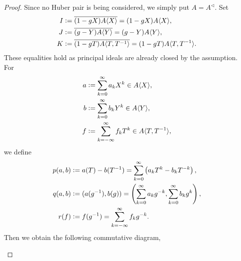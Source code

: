 \documentclass[10pt]{article}
\numberwithin{equation}{section}
\theoremstyle{definition}
\newcommand{\defeq}{\vcentcolon=}
\begin{document}
\begin{proof}
    Since no Huber pair is being considered, we simply put $A=A^\triangleleft$. Set 
    \begin{align*}
        I &\defeq\overline{(1-gX)A\langle X\rangle}= (1-gX)A\langle X\rangle,\\
        J &\defeq\overline{(g-Y)A\langle Y\rangle} = (g-Y)A\langle Y\rangle,\\
        K &\defeq \overline{(1-gT)A\langle T,T^{-1}\rangle}=(1-gT)A\langle T,T^{-1}\rangle.
    \end{align*}
    These equalities hold as principal ideals are already closed by the assumption.
    For 
    \begin{align*}
        a & \defeq \sum_{k=0}^\infty a_kX^k\in A\langle X\rangle,\\
        b & \defeq \sum_{k=0}^\infty  b_k Y^k\in A\langle Y\rangle,\\
        f & \defeq \sum_{k=-\infty}^\infty f_kT^k\in A\langle T,T^{-1}\rangle,
    \end{align*}
    we define 
    \begin{align*}
        p(a,b)&\defeq a(T)-b(T^{-1})=\sum_{k=0}^\infty \left(a_kT^{k}-b_kT^{-k}\right),\\
        q(a,b)&\defeq (a(g^{-1}),b(g)) = \left(\sum_{k=0}^\infty a_kg^{-k},\sum_{k=0}^\infty b_kg^{k}\right),\\
        r(f)&\defeq f(g^{-1}) = \sum_{k=-\infty}^\infty f_kg^{-k}.
    \end{align*}
    Then we obtain the following commutative diagram,
    \begin{center}
\end{center}
\end{proof}
\end{document}

